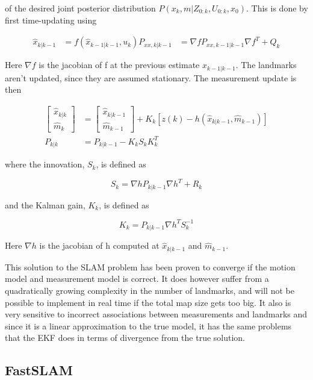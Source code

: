 of the desired joint posterior distribution $P(x_k,m|Z_{0:k},U_{0:k},x_0)$. This is done by first time-updating using

\begin{align}
    \hat{x}_{k|k-1} &= f(\hat{x}_{k-1|k-1},u_k)
    P_{xx,k|k-1} &= \nabla f P_{xx,k-1|k-1}\nabla f^T + Q_k 
\end{align}

Here $\nabla f$ is the jacobian of f at the previous estimate $\hat{x}_{k-1|k-1}$. The landmarks aren't updated, since they are assumed stationary. The measurement update is then

\begin{align}
    \begin{bmatrix} \hat{x}_{k|k} \\ \hat{m}_k \end{bmatrix} &= 
    \begin{bmatrix} \hat{x}_{k|k-1} \\ \hat{m}_{k-1} \end{bmatrix}
    + K_k[z(k) - h(\hat{x}_{k|k-1},\hat{m}_{k-1})] \\
    P_{k|k} &= P_{k|k-1} - K_kS_kK_k^T
\end{align}

where the innovation, $S_k$, is defined as

\begin{equation}
    S_k = \nabla hP_{k|k-1}\nabla h^T + R_k
\end{equation}

and the Kalman gain, $K_k$, is defined as

\begin{equation}
    K_k = P_{k|k-1}\nabla h^T S_k^{-1}
\end{equation}

Here $\nabla h$ is the jacobian of h computed at $\hat{x}_{k|k-1}$ and $\hat{m}_{k-1}$. 

This solution to the SLAM problem has been proven to converge if the motion model and measurement model is correct. It does however suffer from a quadratically growing complexity in the number of landmarks, and will not be possible to implement in real time if the total map size gets too big. It also is very sensitive to incorrect associations between measurements and landmarks and since it is a linear approximation to the true model, it has the same problems that the EKF does in terms of divergence from the true solution. 

\subsection{FastSLAM}

